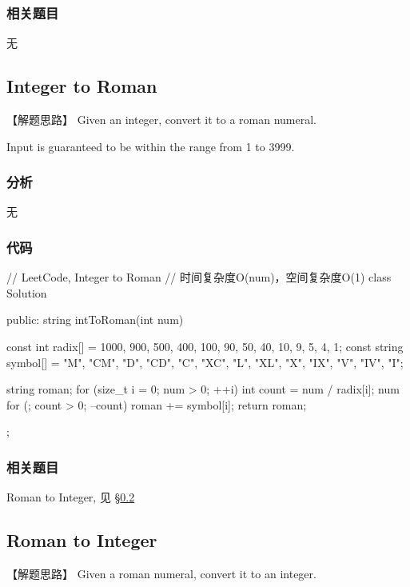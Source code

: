 \subsubsection{相关题目}
\begindot
\item 无
\myenddot


\subsection{Integer to Roman} %
\label{sec:integer-to-roman}


【解题思路】
Given an integer, convert it to a roman numeral.

Input is guaranteed to be within the range from 1 to 3999.


\subsubsection{分析}
无


\subsubsection{代码}
\begin{Code}
	// LeetCode, Integer to Roman
	// 时间复杂度O(num)，空间复杂度O(1)
	class Solution {
		public:
		string intToRoman(int num) {
			const int radix[] = {1000, 900, 500, 400, 100, 90,
				50, 40, 10, 9, 5, 4, 1};
			const string symbol[] = {"M", "CM", "D", "CD", "C", "XC",
				"L", "XL", "X", "IX", "V", "IV", "I"};
			
			string roman;
			for (size_t i = 0; num > 0; ++i) {
				int count = num / radix[i];
				num %
				for (; count > 0; --count) roman += symbol[i];
			}
			return roman;
		}
	};
\end{Code}


\subsubsection{相关题目}
\begindot
\item Roman to Integer, 见 \S \ref{sec:roman-to-integer}
\myenddot


\subsection{Roman to Integer} %
\label{sec:roman-to-integer}


【解题思路】
Given a roman numeral, convert it to an integer.

